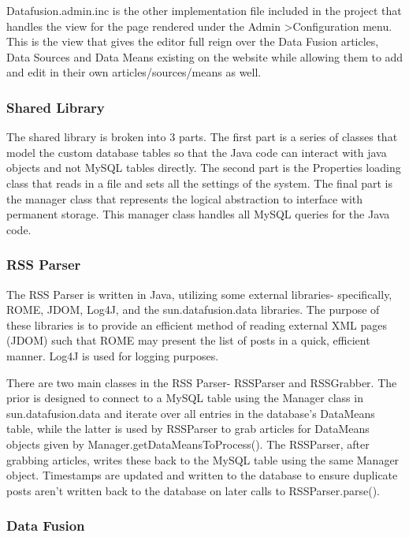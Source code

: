 \documentclass[10pt]{article} %
\begin{document}
Datafusion.admin.inc is the other implementation file included in the project that handles the view for the page rendered under the Admin \textgreater Configuration menu. This is the view that gives the editor full reign over the Data Fusion articles, Data Sources and Data Means existing on the website while allowing them to add and edit in their own articles/sources/means as well.

\subsubsection{Shared Library}

The shared library is broken into 3 parts. The first part is a series of classes that model the custom database tables so that the Java code can interact with java objects and not MySQL tables directly. The second part is the Properties loading class that reads in a file and sets all the settings of the system. The final part is the manager class that represents the logical abstraction to interface with permanent storage. This manager class handles all MySQL queries for the Java code. 

\subsubsection{RSS Parser}

The RSS Parser is written in Java, utilizing some external libraries- specifically, ROME, JDOM, Log4J, and the sun.datafusion.data libraries. The purpose of these libraries is to provide an efficient method of reading external XML pages (JDOM) such that ROME may present the list of posts in a quick, efficient manner. Log4J is used for logging purposes.

There are two main classes in the RSS Parser- RSSParser and RSSGrabber. The prior is designed to connect to a MySQL table using the Manager class in sun.datafusion.data and iterate over all entries in the database’s DataMeans table, while the latter is used by RSSParser to grab articles for DataMeans objects given by Manager.getDataMeansToProcess(). The RSSParser, after grabbing articles, writes these back to the MySQL table using the same Manager object. Timestamps are updated and written to the database to ensure duplicate posts aren’t written back to the database on later calls to RSSParser.parse().

\subsubsection{Data Fusion}
\end{document}
